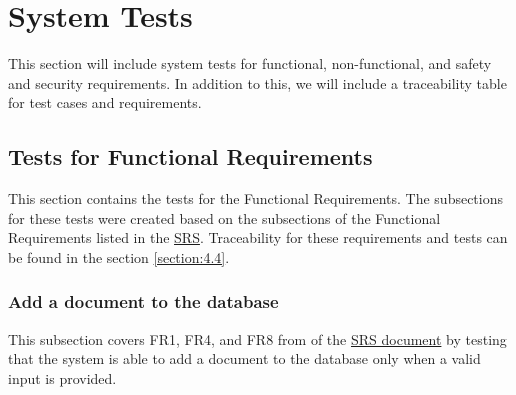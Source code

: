 \documentclass[12pt, titlepage]{article}
\begin{document}
\section{System Tests} \label{section:4}

This section will include system tests for functional, non-functional, and safety and security requirements. In addition to this, we will include a traceability table for test cases and requirements.

\subsection{Tests for Functional Requirements} \label{section:4.1}



This section contains the tests for the Functional Requirements. The subsections for these tests were created based on the subsections of the Functional Requirements listed in the \href{https://github.com/Inreet-Kaur/capstone/blob/main/docs/SRS/SRS.pdf}{SRS}. Traceability for these requirements and tests can be found in the section \ref{section:4.4}.


\subsubsection{Add a document to the database} \label{section:4.1.1}

This subsection covers FR1, FR4, and FR8 from of the \href{https://github.com/Inreet-Kaur/capstone/blob/main/docs/SRS/SRS.pdf}{SRS document} by testing that the system is able to add a document to the database only when a valid input is provided.
\end{document}
